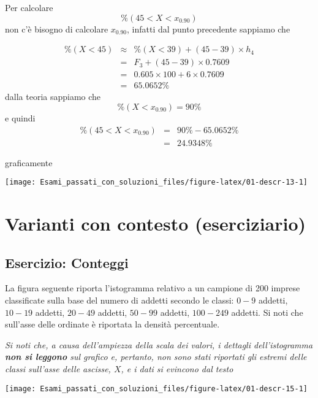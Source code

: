 \documentclass[
  11pt,
]{book}
\theoremstyle{mytheoremstyle}
\theoremstyle{mydefstyle}
\newenvironment{sol}
  {
  \begin{tcolorbox}[enhanced,breakable,arc=0.1mm,boxrule=1pt,colback=white,colframe=iblue,
  title=\bf \fontfamily{lmss}\selectfont \hspace{.5 cm} Soluzione,drop fuzzy shadow]

}{
\end{tcolorbox}
  }
\begin{document}
\begin{sol}

Per calcolare
\[
\%(45< X < x_{0.90})
\]
non c'è bisogno di calcolare \(x_{0.90}\), infatti dal punto precedente sappiamo che

\begin{eqnarray*}
\%(X<45)   &\approx&  \%(X<39)+(45-39)\times h_4\\
&=& F_3+(45-39)\times 0.7609\\
&=& 0.605\times 100 + 6\times 0.7609\\
&=& 65.0652\%
\end{eqnarray*}
dalla teoria sappiamo che
\[
\%(X<x_{0.90})=90\%
\]
e quindi
\begin{eqnarray*}
\%(45< X < x_{0.90}) &=& 90\%-65.0652\%\\
                     &=& 24.9348\%
\end{eqnarray*}

graficamente

\begin{center}\texttt{[image: Esami\_passati\_con\_soluzioni\_files/figure-latex/01-descr-13-1]} \end{center}

\end{sol}

\section{Varianti con contesto (eserciziario)}\label{varianti-con-contesto-eserciziario}

\subsection{Esercizio: Conteggi}\label{esercizio-conteggi}

La figura seguente riporta l'istogramma relativo a un campione
di 200 imprese classificate sulla base del numero di addetti
secondo le classi: \(0-9\) addetti, \(10-19\) addetti, \(20-49\) addetti,
\(50-99\) addetti, \(100-249\) addetti.
Si noti che sull'asse delle ordinate è riportata la densità
percentuale.

\emph{Si noti che, a causa dell'ampiezza della scala dei valori, i dettagli dell'istogramma \textbf{non si leggono} sul grafico e, pertanto, non sono stati riportati gli estremi delle classi sull'asse delle ascisse, \(X\), e i dati si evincono dal testo}

\begin{center}\texttt{[image: Esami\_passati\_con\_soluzioni\_files/figure-latex/01-descr-15-1]} \end{center}
\end{document}
